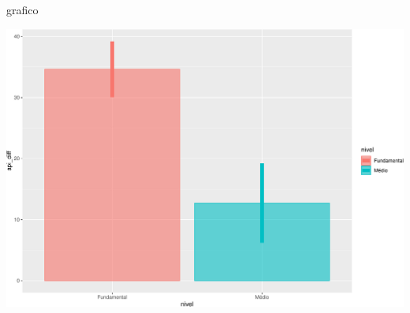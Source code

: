 \documentclass[
  9pt,
  ignorenonframetext,
]{beamer}
\newenvironment{Shaded}{\begin{snugshade}}{\end{snugshade}}
\newcommand{\NormalTok}[1]{#1}
\begin{document}
\begin{frame}[fragile]{}
\protect\hypertarget{section-6}{}
\begin{Shaded}
\begin{Highlighting}[]
\NormalTok{grafico}
\end{Highlighting}
\end{Shaded}

\includegraphics{aula_05_files/figure-beamer/unnamed-chunk-7-1.pdf}
\end{frame}
\end{document}
